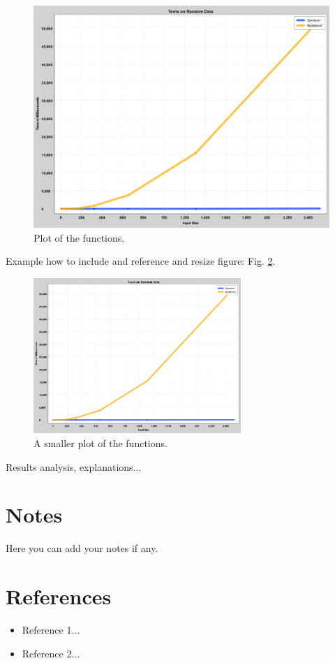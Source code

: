 \documentclass[11pt]{article}
\begin{document}
    
    \begin{figure}[h!]
            \centering
            \includegraphics[width=\textwidth]{Tests on Random Data.png}
            \caption{Plot of the functions.}
            \label{fig:plot}
    \end{figure}


Example how to include and reference and resize figure: Fig. \ref{fig:plot2}.
    
    
    \begin{figure}[h!]
            \centering
            \includegraphics[width=0.7\textwidth]{Tests on Random Data.png}
            \caption{A smaller plot of the functions.}
            \label{fig:plot2}
    \end{figure}

    
Results analysis, explanations...



\section{Notes}

Here you can add your notes if any.



\section*{References}


\begin{itemize}
    \item {Reference 1...}
    \item {Reference 2...}
\end{itemize}
\end{document}
